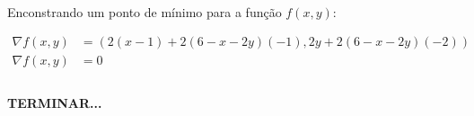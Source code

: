\documentclass{article}
\begin{document}
            \paragraph{}
            Enconstrando um ponto de mínimo para a função $f(x, y)$:

            \begin{align*}
                \nabla f(x, y) &= \left(2(x - 1) + 2(6 - x - 2y)(-1), 2y + 2(6 - x - 2y)(-2)\right)\\
                \nabla f(x, y) &= 0\\
            \end{align*}

            \paragraph{}
            \textbf{TERMINAR...}
\end{document}
